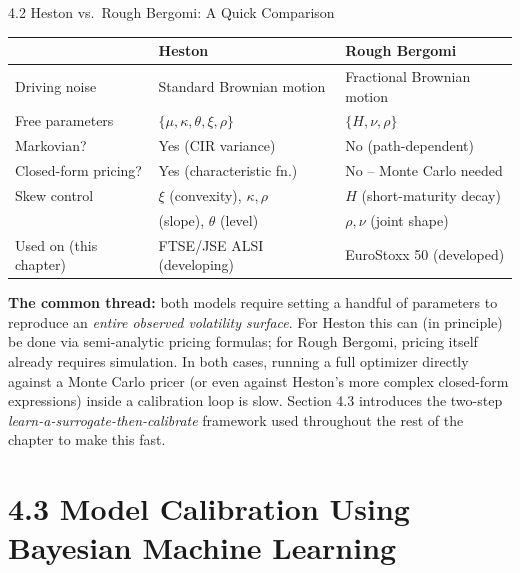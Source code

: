 \documentclass[aspectratio=169,10pt]{beamer}
\begin{document}
\begin{frame}[allowframebreaks]{4.2 Heston vs.\ Rough Bergomi: A Quick Comparison}

\begin{table}
\centering
\small
\begin{tabular}{lll}
\toprule
 & \textbf{Heston} & \textbf{Rough Bergomi} \\
\midrule
Driving noise & Standard Brownian motion & Fractional Brownian motion \\
Free parameters & $\{\mu,\kappa,\theta,\xi,\rho\}$ & $\{H,\nu,\rho\}$ \\
Markovian? & Yes (CIR variance) & No (path-dependent) \\
Closed-form pricing? & Yes (characteristic fn.) & No -- Monte Carlo needed \\
Skew control & $\xi$ (convexity), $\kappa,\rho$ & $H$ (short-maturity decay) \\
 & (slope), $\theta$ (level) & $\rho,\nu$ (joint shape) \\
Used on (this chapter) & FTSE/JSE ALSI (developing) & EuroStoxx 50 (developed) \\
\bottomrule
\end{tabular}
\end{table}

\textbf{The common thread:} both models require setting a handful of
parameters to reproduce an \emph{entire observed volatility surface}. For
Heston this can (in principle) be done via semi-analytic pricing formulas;
for Rough Bergomi, pricing itself already requires simulation. In both
cases, running a full optimizer directly against a Monte Carlo pricer
(or even against Heston's more complex closed-form expressions) inside a
calibration loop is slow. Section 4.3 introduces the two-step
\emph{learn-a-surrogate-then-calibrate} framework used throughout the
rest of the chapter to make this fast.

\end{frame}

\section{4.3 Model Calibration Using Bayesian Machine Learning}
\end{document}

